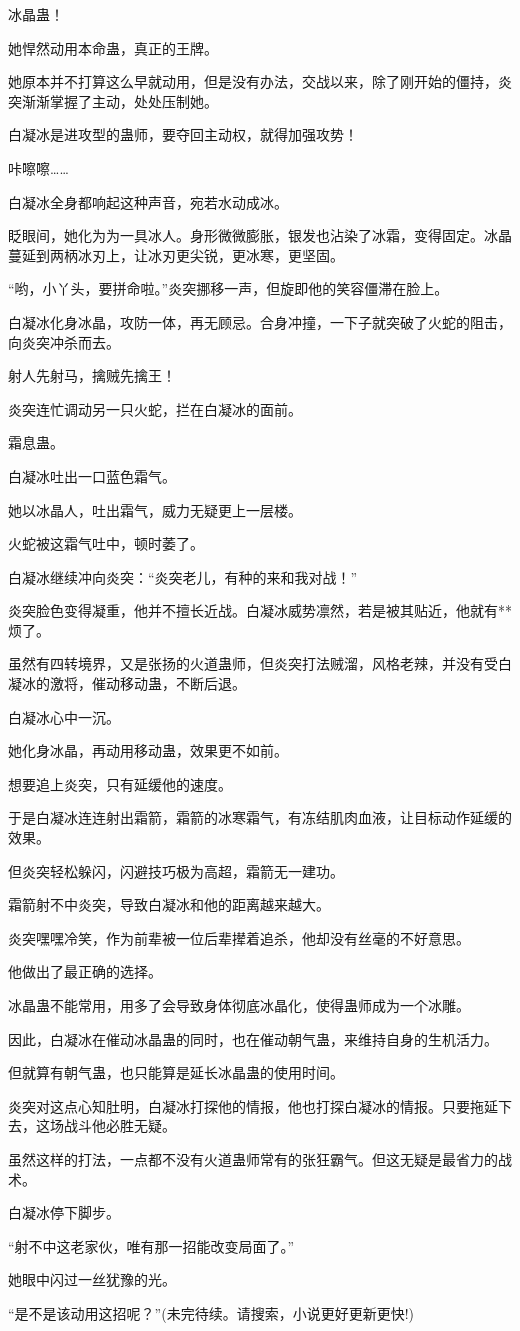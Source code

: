 \begin{this_body}
冰晶蛊！

她悍然动用本命蛊，真正的王牌。

她原本并不打算这么早就动用，但是没有办法，交战以来，除了刚开始的僵持，炎突渐渐掌握了主动，处处压制她。

白凝冰是进攻型的蛊师，要夺回主动权，就得加强攻势！

咔嚓嚓……

白凝冰全身都响起这种声音，宛若水动成冰。

眨眼间，她化为为一具冰人。身形微微膨胀，银发也沾染了冰霜，变得固定。冰晶蔓延到两柄冰刃上，让冰刃更尖锐，更冰寒，更坚固。

“哟，小丫头，要拼命啦。”炎突挪移一声，但旋即他的笑容僵滞在脸上。

白凝冰化身冰晶，攻防一体，再无顾忌。合身冲撞，一下子就突破了火蛇的阻击，向炎突冲杀而去。

射人先射马，擒贼先擒王！

炎突连忙调动另一只火蛇，拦在白凝冰的面前。

霜息蛊。

白凝冰吐出一口蓝色霜气。

她以冰晶人，吐出霜气，威力无疑更上一层楼。

火蛇被这霜气吐中，顿时萎了。

白凝冰继续冲向炎突：“炎突老儿，有种的来和我对战！”

炎突脸色变得凝重，他并不擅长近战。白凝冰威势凛然，若是被其贴近，他就有**烦了。

虽然有四转境界，又是张扬的火道蛊师，但炎突打法贼溜，风格老辣，并没有受白凝冰的激将，催动移动蛊，不断后退。

白凝冰心中一沉。

她化身冰晶，再动用移动蛊，效果更不如前。

想要追上炎突，只有延缓他的速度。

于是白凝冰连连射出霜箭，霜箭的冰寒霜气，有冻结肌肉血液，让目标动作延缓的效果。

但炎突轻松躲闪，闪避技巧极为高超，霜箭无一建功。

霜箭射不中炎突，导致白凝冰和他的距离越来越大。

炎突嘿嘿冷笑，作为前辈被一位后辈撵着追杀，他却没有丝毫的不好意思。

他做出了最正确的选择。

冰晶蛊不能常用，用多了会导致身体彻底冰晶化，使得蛊师成为一个冰雕。

因此，白凝冰在催动冰晶蛊的同时，也在催动朝气蛊，来维持自身的生机活力。

但就算有朝气蛊，也只能算是延长冰晶蛊的使用时间。

炎突对这点心知肚明，白凝冰打探他的情报，他也打探白凝冰的情报。只要拖延下去，这场战斗他必胜无疑。

虽然这样的打法，一点都不没有火道蛊师常有的张狂霸气。但这无疑是最省力的战术。

白凝冰停下脚步。

“射不中这老家伙，唯有那一招能改变局面了。”

她眼中闪过一丝犹豫的光。

“是不是该动用这招呢？”(未完待续。请搜索，小说更好更新更快!)

\end{this_body}

